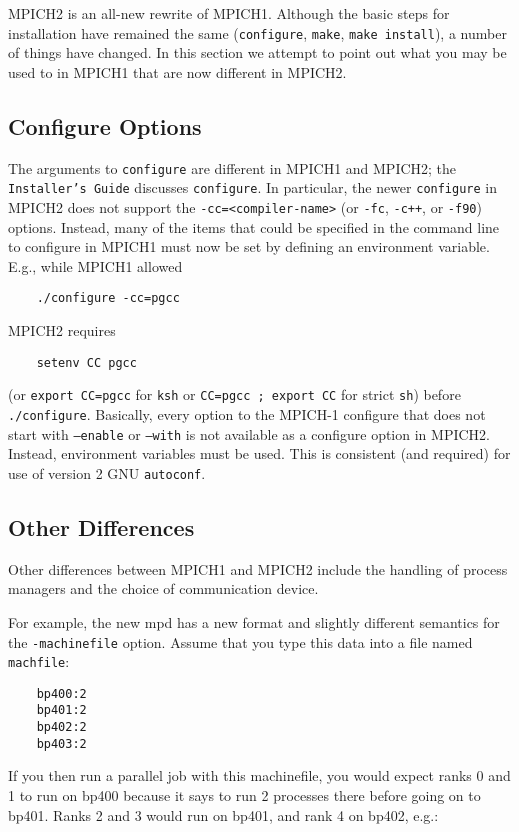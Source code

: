 \documentclass[dvipdfm,11pt]{article}
\begin{document}
MPICH2 is an all-new rewrite of MPICH1.  Although the basic steps for
installation have remained the same (\texttt{configure}, \texttt{make},
\texttt{make install}), a number of things have changed.  In this
section we attempt to point out what you may be used to in MPICH1 that
are now different in MPICH2.

\subsection{Configure Options}
\label{sec:configure-options}

The arguments to \texttt{configure} are different in MPICH1 and MPICH2;
the \texttt{Installer's Guide} discusses \texttt{configure}.  In
particular, the newer \texttt{configure} in MPICH2 does not support the
\verb+-cc=<compiler-name>+ (or \texttt{-fc}, \texttt{-c++}, or
\texttt{-f90}) options.  Instead, many of the items that could be
specified in the command line to configure in MPICH1 must now be set by
defining an environment variable.  E.g., while MPICH1 allowed
\begin{verbatim}
    ./configure -cc=pgcc
\end{verbatim}
MPICH2 requires
\begin{verbatim}
    setenv CC pgcc
\end{verbatim}
(or \verb+export CC=pgcc+ for \texttt{ksh} or \verb+CC=pgcc ; export CC+
for strict \texttt{sh}) before \texttt{./configure}.  Basically, every
option to the MPICH-1 configure that does not start with
\texttt{--enable} or \texttt{--with} is not available as a configure
option in MPICH2.  Instead, environment variables must be used.  This is
consistent (and required) for use of version 2 GNU \texttt{autoconf}.

\subsection{Other Differences}
Other differences between MPICH1 and MPICH2 include the handling of
process managers and the choice of communication device.

For example, the new mpd has a new format and slightly different
semantics for the \texttt{-machinefile} option.  Assume that you type this
data into a file named \texttt{machfile}:
\begin{verbatim}
    bp400:2
    bp401:2
    bp402:2
    bp403:2
\end{verbatim}

If you then run a parallel job with this machinefile, you would expect
ranks 0 and 1 to run on bp400 because it says to run 2 processes there
before going on to bp401.  Ranks 2 and 3 would run on bp401, and rank
4 on bp402, e.g.:
\end{document}
